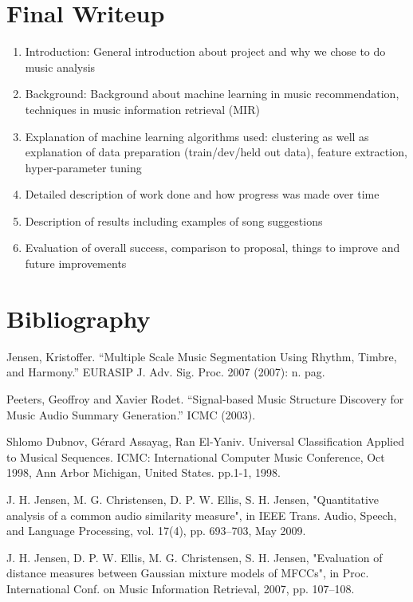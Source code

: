 \documentclass[11pt]{article}
\begin{document}
\section{Final Writeup}
\begin{enumerate}
\item Introduction: General introduction about project and why we chose to do music analysis
\item Background: Background about machine learning in music recommendation, techniques in music information retrieval (MIR)
\item Explanation of machine learning algorithms used: clustering as well as explanation of data preparation (train/dev/held out data), feature extraction, hyper-parameter tuning
\item Detailed description of work done and how progress was made over time
\item Description of results including examples of song suggestions
\item Evaluation of overall success, comparison to proposal, things to improve and future improvements
\end{enumerate}





\section{Bibliography}
Jensen, Kristoffer. “Multiple Scale Music Segmentation Using Rhythm, Timbre, and Harmony.” EURASIP J. Adv. Sig. Proc. 2007 (2007): n. pag.

Peeters, Geoffroy and Xavier Rodet. “Signal-based Music Structure Discovery for Music Audio Summary Generation.” ICMC (2003).

Shlomo Dubnov, Gérard Assayag, Ran El-Yaniv. Universal Classification Applied to Musical Sequences. ICMC: International Computer Music Conference, Oct 1998, Ann Arbor Michigan, United States. pp.1-1, 1998. 

J. H. Jensen, M. G. Christensen, D. P. W. Ellis, S. H. Jensen, "Quantitative analysis of a common audio similarity measure", in IEEE Trans. Audio, Speech, and Language Processing, vol. 17(4), pp. 693–703, May 2009.

J. H. Jensen, D. P. W. Ellis, M. G. Christensen, S. H. Jensen, "Evaluation of distance measures between Gaussian mixture models of MFCCs", in Proc. International Conf. on Music Information Retrieval, 2007, pp. 107–108.
\end{document}
